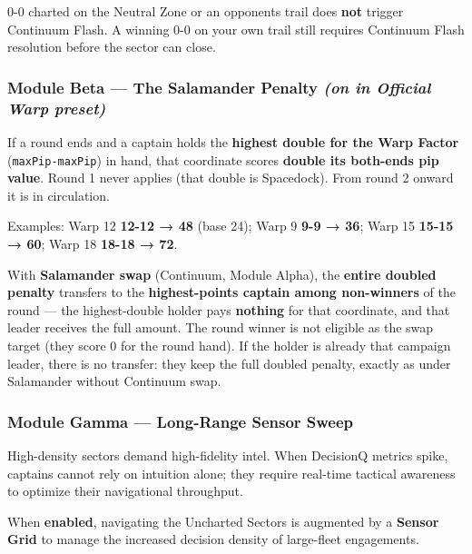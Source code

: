 \documentclass[11pt]{article}
\begin{document}
0-0 charted on the Neutral Zone or an opponent\textquotesingle s trail
does \textbf{not} trigger Continuum Flash. A winning 0-0 on your own
trail still requires Continuum Flash resolution before the sector can
close.

\subsubsection{\texorpdfstring{Module Beta --- The Salamander Penalty
\emph{(on in Official Warp
preset)}}{Module Beta --- The Salamander Penalty (on in Official Warp preset)}}\label{module-beta--the-salamander-penalty-on-in-official-warp-preset}

If a round ends and a captain holds the \textbf{highest double for the
Warp Factor} (\texttt{maxPip-maxPip}) in hand, that coordinate scores
\textbf{double its both-ends pip value}. Round 1 never applies (that
double is Spacedock). From round 2 onward it is in circulation.

Examples: Warp 12 \textbf{12-12 → 48} (base 24); Warp 9 \textbf{9-9 →
36}; Warp 15 \textbf{15-15 → 60}; Warp 18 \textbf{18-18 → 72}.

With \textbf{Salamander swap} (Continuum, Module Alpha), the
\textbf{entire doubled penalty} transfers to the
\textbf{highest-points captain among non-winners} of the round --- the
highest-double holder pays \textbf{nothing} for that coordinate, and that
leader receives the full amount. The round winner is not eligible as the
swap target (they score 0 for the round hand). If the holder is already
that campaign leader, there is no transfer: they keep the full doubled
penalty, exactly as under Salamander without Continuum swap.

\subsubsection{Module Gamma --- Long-Range Sensor
Sweep}\label{module-gamma--long-range-sensor-sweep}

High-density sectors demand high-fidelity intel. When DecisionQ metrics
spike, captains cannot rely on intuition alone; they require real-time
tactical awareness to optimize their navigational throughput.

When \textbf{enabled}, navigating the Uncharted Sectors is augmented by
a \textbf{Sensor Grid} to manage the increased decision density of
large-fleet engagements.
\end{document}
